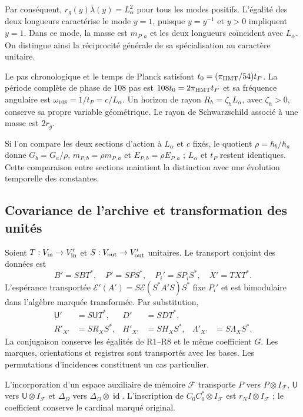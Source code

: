 Par conséquent, $r_g(y)\bar\lambda(y)=L_\alpha^2$ pour tous les modes
positifs. L'égalité des deux longueurs caractérise le mode $y=1$,
puisque $y=y^{-1}$ et $y>0$ impliquent $y=1$. Dans ce mode, la masse est
$m_{P,a}$ et les deux longueurs coïncident avec $L_\alpha$. On distingue ainsi
la réciprocité générale de sa spécialisation au caractère unitaire.

Le pas chronologique et le temps de Planck satisfont $t_0=(\pi_{\rm HMT}/54)t_P$. La période complète de phase de 108 pas est $108t_0=2\pi_{\rm HMT}t_P$ et sa fréquence angulaire est $\omega_{108}=1/t_P=c/L_\alpha$. Un horizon de rayon $R_h=\zeta_hL_\alpha$, avec $\zeta_h>0$, conserve sa propre variable géométrique. Le rayon de Schwarzschild associé à une masse est $2r_g$.

Si l'on compare les deux sections d'action à $L_\alpha$ et $c$ fixés,
le quotient $\rho=\hbar_b/\hbar_a$ donne
$G_b=G_a/\rho$, $m_{P,b}=\rho m_{P,a}$ et
$E_{P,b}=\rho E_{P,a}$ ; $L_\alpha$ et $t_P$ restent identiques.
Cette comparaison entre sections maintient la distinction avec une
évolution temporelle des constantes.

\subsection{Covariance de l'archive et transformation des unités}

Soient \(T:V_{\rm in}\to V'_{\rm in}\) et
\(S:V_{\rm out}\to V'_{\rm out}\) unitaires. Le transport conjoint
des données est
\[
 B'=SBT^*,\quad P'=SPS^*,\quad P_i'=SP_iS^*,\quad X'=TXT^*.
\]
L'espérance transportée \(\mathcal E'(A')=S\mathcal E(S^*A'S)S^*\) fixe \(P_i'\) et est bimodulaire dans l'algèbre marquée transformée. Par substitution,
\begin{align*}
 \mathsf U'&=S\mathsf UT^*,&D'&=SDT^*,\\
 R'_{X'}&=SR_XS^*,&H'_{X'}&=SH_XS^*,&
 \Lambda'_{X'}&=S\Lambda_XS^*.
\end{align*}
La conjugaison conserve les égalités de R1--R8 et le même coefficient
\(G\). Les marques, orientations et registres sont transportés avec les
bases. Les permutations d'incidences constituent un cas particulier.

L'incorporation d'un espace auxiliaire de mémoire \(\mathcal F\)
transporte \(P\) vers \(P\otimes I_{\mathcal F}\),
\(\mathsf U\) vers \(\mathsf U\otimes I_{\mathcal F}\) et
\(\Delta_\Omega\) vers \(\Delta_\Omega\otimes\operatorname{id}\).
L'inscription de \(C_0C_0^*\otimes I_{\mathcal F}\) est
\(r_N I\otimes I_{\mathcal F}\) ; le coefficient conserve le cardinal
marqué original.

